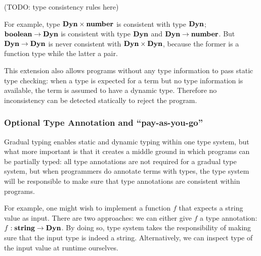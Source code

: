 (TODO: type consistency rules here)

For example, type $\textbf{Dyn} \times \textbf{number}$ is consistent with type $\textbf{Dyn}$;
$\textbf{boolean} \rightarrow \textbf{Dyn}$ is consistent with type $\textbf{Dyn}$ and $\textbf{Dyn} \rightarrow \textbf{number}$. But $\textbf{Dyn} \rightarrow \textbf{Dyn}$ is never consistent with $\textbf{Dyn} \times \textbf{Dyn}$, because the former is a function type while the latter a pair.

This extension also allows programs without any type information to pass static 
type checking: when a type is expected for a term but no type information is available,
the term is assumed to have a dynamic type. Therefore no inconsistency can be detected
statically to reject the program.







\subsubsection{Optional Type Annotation and ``pay-as-you-go''}

Gradual typing enables static and dynamic typing within one type system,
but what more important is that it creates a middle ground in which programs
can be partially typed: all type annotations are not required for a gradual type system,
but when programmers do annotate terms with types,
the type system will be responsible to make sure that type annotations are consistent
within programs.

For example, one might wish to implement a function $f$ that expects a string value
as input. There are two approaches: we can either give $f$ a type annotation:
$f : \textbf{string} \rightarrow \textbf{Dyn}$. By doing so, type system takes the responsibility
of making sure that the input type is indeed a string. Alternatively,
we can inspect type of the input value at runtime ourselves.

